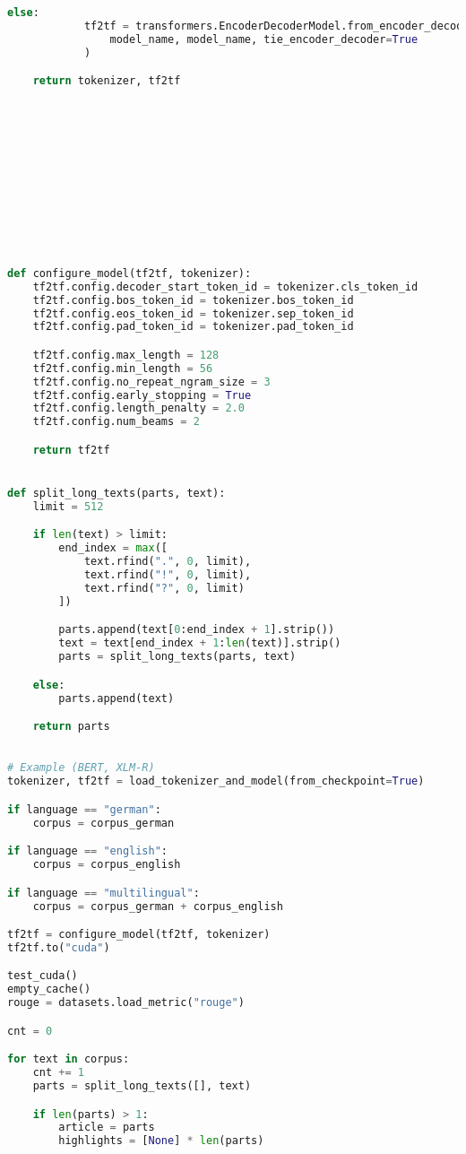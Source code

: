 \begin{lstlisting}[language=Python, caption=Beispielcode]
        else:
            tf2tf = transformers.EncoderDecoderModel.from_encoder_decoder_pretrained(
                model_name, model_name, tie_encoder_decoder=True
            )

    return tokenizer, tf2tf












def configure_model(tf2tf, tokenizer):
    tf2tf.config.decoder_start_token_id = tokenizer.cls_token_id
    tf2tf.config.bos_token_id = tokenizer.bos_token_id
    tf2tf.config.eos_token_id = tokenizer.sep_token_id
    tf2tf.config.pad_token_id = tokenizer.pad_token_id

    tf2tf.config.max_length = 128
    tf2tf.config.min_length = 56
    tf2tf.config.no_repeat_ngram_size = 3
    tf2tf.config.early_stopping = True
    tf2tf.config.length_penalty = 2.0
    tf2tf.config.num_beams = 2

    return tf2tf


def split_long_texts(parts, text):
    limit = 512

    if len(text) > limit:
        end_index = max([
            text.rfind(".", 0, limit),
            text.rfind("!", 0, limit),
            text.rfind("?", 0, limit)
        ])

        parts.append(text[0:end_index + 1].strip())
        text = text[end_index + 1:len(text)].strip()
        parts = split_long_texts(parts, text)

    else:
        parts.append(text)

    return parts
    

# Example (BERT, XLM-R)
tokenizer, tf2tf = load_tokenizer_and_model(from_checkpoint=True)

if language == "german":
    corpus = corpus_german

if language == "english":
    corpus = corpus_english

if language == "multilingual":
    corpus = corpus_german + corpus_english

tf2tf = configure_model(tf2tf, tokenizer)
tf2tf.to("cuda")

test_cuda()
empty_cache()
rouge = datasets.load_metric("rouge")

cnt = 0

for text in corpus:
    cnt += 1
    parts = split_long_texts([], text)

    if len(parts) > 1:
        article = parts
        highlights = [None] * len(parts)


\end{lstlisting}
